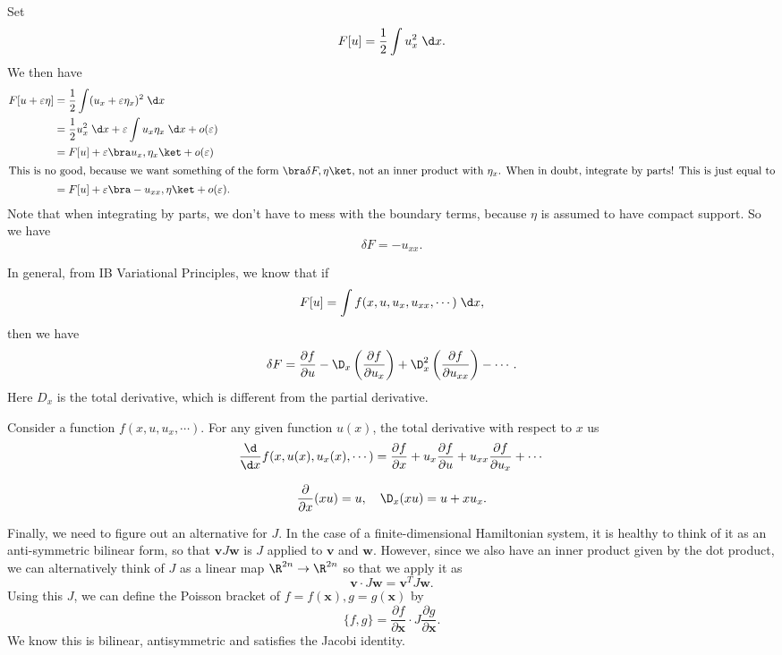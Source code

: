 \documentclass[a4paper]{article}
\begin{document}
\begin{eg}
  Set
  \[
    F[u] = \frac{1}{2} \int u_x^2 \;\d x.
  \]
  We then have
  \begin{align*}
    F[u + \varepsilon \eta] &= \frac{1}{2}\int (u_x + \varepsilon \eta_x)^2 \;\d x\\
    &= \frac{1}{2} u_x^2 \;\d x + \varepsilon \int u_x \eta_x \;\d x + o(\varepsilon)\\
    &= F[u] + \varepsilon \bra u_x, \eta_x\ket + o(\varepsilon)\\
    \intertext{This is no good, because we want something of the form $\bra \delta F, \eta\ket$, not an inner product with $\eta_x$. When in doubt, integrate by parts! This is just equal to}
    &= F[u] + \varepsilon \bra -u_{xx}, \eta\ket + o(\varepsilon).
  \end{align*}
  Note that when integrating by parts, we don't have to mess with the boundary terms, because $\eta$ is assumed to have compact support. So we have
  \[
    \delta F = - u_{xx}.
  \]
\end{eg}
In general, from IB Variational Principles, we know that if
\[
  F[u] = \int f(x, u, u_x, u_{xx}, \cdots)\;\d x,
\]
then we have
\[
  \delta F = \frac{\partial f}{\partial u} - \D_x\left(\frac{\partial f}{\partial u_x}\right) + \D_x^2 \left(\frac{\partial f}{\partial u_{xx}}\right) - \cdots.
\]
Here $D_x$ is the total derivative, which is different from the partial derivative.
\begin{defi}
  Consider a function $f(x, u, u_x, \cdots)$. For any given function $u(x)$, the total derivative with respect to $x$ us
  \[
    \frac{\d}{\d x} f(x, u(x), u_x(x), \cdots) = \frac{\partial f}{\partial x} + u_x \frac{\partial f}{\partial u} + u_{xx} \frac{\partial f}{\partial u_x} + \cdots
  \]
\end{defi}

\begin{eg}
  \[
    \frac{\partial}{\partial x}(xu) = u,\quad \D_x (xu) = u + x u_x.
  \]
\end{eg}

Finally, we need to figure out an alternative for $J$. In the case of a finite-dimensional Hamiltonian system, it is healthy to think of it as an anti-symmetric bilinear form, so that $\mathbf{v}J\mathbf{w}$ is $J$ applied to $\mathbf{v}$ and $\mathbf{w}$. However, since we also have an inner product given by the dot product, we can alternatively think of $J$ as a linear map $\R^{2n} \to \R^{2n}$ so that we apply it as
\[
  \mathbf{v} \cdot J \mathbf{w} = \mathbf{v}^T J \mathbf{w}.
\]
Using this $J$, we can define the Poisson bracket of $f = f(\mathbf{x}), g = g(\mathbf{x})$ by
\[
  \{f, g\} = \frac{\partial f}{\partial \mathbf{x}} \cdot J \frac{\partial g}{\partial \mathbf{x}}.
\]
We know this is bilinear, antisymmetric and satisfies the Jacobi identity.
\end{document}
